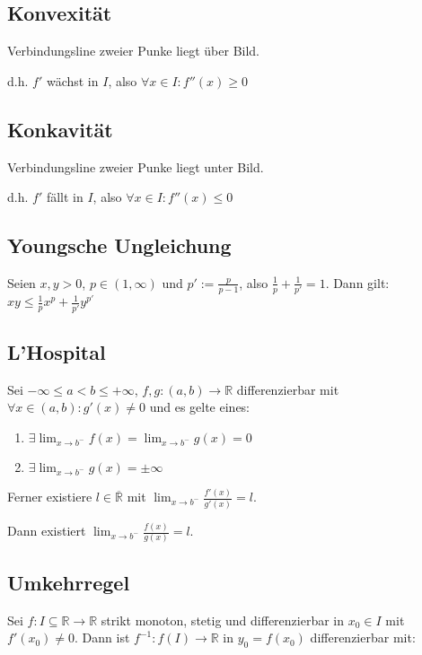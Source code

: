 \subsection*{Konvexität}

Verbindungsline zweier Punke liegt über Bild.

d.h. $f'$ wächst in $I$, also $\forall x \in I : f''(x) \geq 0$

\subsection*{Konkavität}

Verbindungsline zweier Punke liegt unter Bild.

d.h. $f'$ fällt in $I$, also $\forall x \in I : f''(x) \leq 0$

\subsection*{Youngsche Ungleichung}

Seien $x, y > 0$, $p \in (1, \infty)$ und $p' := \frac{p}{p-1}$, also $\frac{1}{p}+\frac{1}{p'}=1$. Dann gilt: $xy \leq \frac{1}{p}x^p + \frac{1}{p'}y^{p'}$

\subsection*{L'Hospital}

Sei $-\infty \leq a < b \leq +\infty$, $f, g : (a, b) \rightarrow \mathbb{R}$ differenzierbar mit $\forall x \in (a, b) : g'(x) \neq 0$ und es gelte eines:

\begin{enumerate}[label=(\alph*)]
	\item $\exists \lim_{x \to b^-} f(x) = \lim_{x \to b^-} g(x) = 0$
	\item $\exists \lim_{x \to b^-} g(x) = \pm \infty$
\end{enumerate}

Ferner existiere $l \in \overline{\mathbb{R}}$ mit $\lim_{x \to b^-} \frac{f'(x)}{g'(x)} = l$.

Dann existiert $\lim_{x \to b^-} \frac{f(x)}{g(x)} = l$.

\subsection*{Umkehrregel}

Sei $f : I \subseteq \mathbb{R} \to \mathbb{R}$ strikt monoton, stetig und differenzierbar in $x_0 \in I$ mit $f'(x_0) \neq 0$. Dann ist $f^{-1} : f(I) \to \mathbb{R}$ in $y_0 = f(x_0)$ differenzierbar mit:


